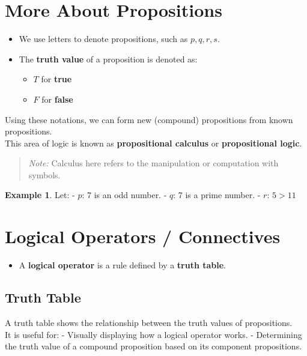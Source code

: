 \documentclass[
]{book}
\providecommand{\tightlist}{%
  \setlength{\itemsep}{0pt}\setlength{\parskip}{0pt}}
\theoremstyle{definition}
\theoremstyle{definition}
\newtheorem{example}{Example}[chapter]
\theoremstyle{definition}
\theoremstyle{definition}
\theoremstyle{remark}
\begin{document}
\section{More About Propositions}\label{more-about-propositions}

\begin{itemize}
\tightlist
\item
  We use letters to denote propositions, such as \(p, q, r, s\).
\item
  The \textbf{truth value} of a proposition is denoted as:

  \begin{itemize}
  \tightlist
  \item
    \(T\) for \textbf{true}
  \item
    \(F\) for \textbf{false}
  \end{itemize}
\end{itemize}

Using these notations, we can form new (compound) propositions from known propositions.\\
This area of logic is known as \textbf{propositional calculus} or \textbf{propositional logic}.

\begin{quote}
\emph{Note:} Calculus here refers to the manipulation or computation with symbols.
\end{quote}

\begin{example}
\protect\hypertarget{exm:unnamed-chunk-11}{}\label{exm:unnamed-chunk-11}Let:
- \(p\): 7 is an odd number.
- \(q\): 7 is a prime number.
- \(r\): \(5 > 11\)
\end{example}

\section{Logical Operators / Connectives}\label{logical-operators-connectives}

\begin{itemize}
\tightlist
\item
  A \textbf{logical operator} is a rule defined by a \textbf{truth table}.
\end{itemize}

\subsection{Truth Table}\label{truth-table}

A truth table shows the relationship between the truth values of propositions.\\
It is useful for:
- Visually displaying how a logical operator works.
- Determining the truth value of a compound proposition based on its component propositions.
\end{document}
